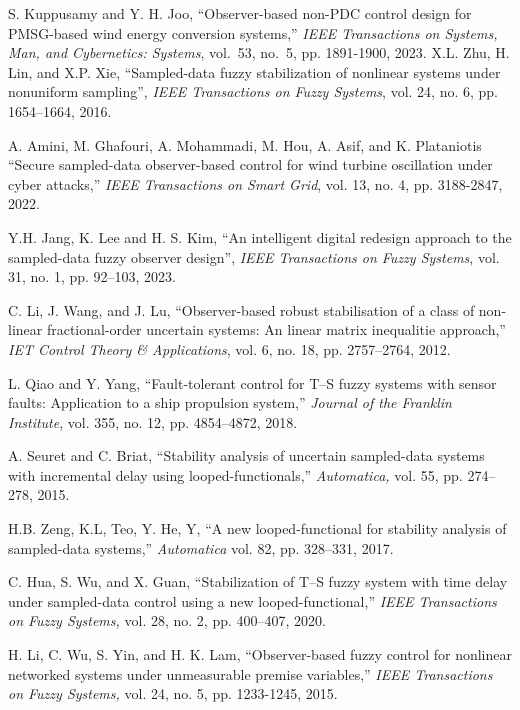 \documentclass[preprint,11pt]{elsarticle}
\begin{document}
\begin{thebibliography}{00}
S. Kuppusamy and Y. H. Joo, ``Observer-based non-PDC control design for PMSG-based wind energy conversion systems,'' {\em  IEEE Transactions on Systems, Man, and Cybernetics: Systems}, vol.~53, no.~5, pp. 1891-1900, 2023.
X.L. Zhu, H. Lin, and X.P. Xie, ``Sampled-data fuzzy stabilization of nonlinear systems under nonuniform sampling'', {\em IEEE Transactions on Fuzzy Systems}, vol. 24, no. 6, pp. 1654–1664, 2016.

{A. Amini, M. Ghafouri, A. Mohammadi, M. Hou, A. Asif, and K. Plataniotis ``Secure sampled-data observer-based control for wind turbine oscillation under cyber attacks,'' {\em IEEE Transactions on Smart Grid}, vol. 13, no. 4, pp. 3188-2847, 2022.}

Y.H. Jang, K. Lee and H. S. Kim, ``An intelligent digital redesign approach to the sampled-data fuzzy observer design'', {\em IEEE Transactions on Fuzzy Systems}, vol. 31, no. 1, pp. 92–103, 2023.



C. Li, J. Wang, and J. Lu, ``Observer-based robust stabilisation of a class of non-linear fractional-order uncertain systems: An linear matrix inequalitie approach,'' {\em IET Control Theory \& Applications}, vol. 6, no. 18, pp. 2757–2764, 2012.

 L. Qiao and Y. Yang, ``Fault-tolerant control for T–S fuzzy systems with sensor faults: Application to a ship propulsion system,'' {\em Journal of the Franklin Institute}, vol. 355, no. 12, pp. 4854–4872, 2018.

{A. Seuret and C. Briat, ``Stability analysis of uncertain sampled-data systems with incremental delay using looped-functionals,'' {\em Automatica,}
vol. 55, pp. 274–278, 2015.}

{H.B. Zeng, K.L, Teo, Y. He, Y, ``A new looped-functional for stability analysis of sampled-data systems,''
{\em Automatica} vol. 82, pp. 328–331, 2017.}

{C. Hua, S. Wu, and X. Guan, ``Stabilization of T–S fuzzy system with time delay under sampled-data control using a new looped-functional,''
{\em IEEE Transactions on Fuzzy Systems,} vol. 28, no. 2, pp. 400–407, 2020.}

H. Li, C. Wu, S. Yin, and H. K. Lam, ``Observer-based fuzzy control for nonlinear networked systems under unmeasurable premise variables,'' {\em IEEE Transactions on Fuzzy Systems,} vol. 24, no. 5, pp. 1233-1245, 2015.


\end{thebibliography}
\end{document}
